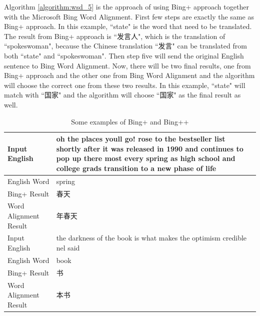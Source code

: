 Algorithm \ref{algorithm:wsd_5} is the approach of using Bing+ approach together with the Microsoft Bing Word Alignment. First few steps are exactly the same as Bing+ approach. In this example, ``state" is the word that need to be translated. The result from Bing+ approach is ``发言人", which is the translation of ``spokeswoman", because the Chinese translation ``发言" can be translated from both ``state" and ``spokeswoman". Then step five will send the original English sentence to Bing Word Alignment. Now, there will be two final results, one from Bing+ approach and the other one from Bing Word Alignment and the algorithm will choose the correct one from these two results. In this example, ``state" will match with ``国家" and the algorithm will choose ``国家" as the final result as well.


\begin{table}[ht]
    \caption{Some examples of Bing+ and Bing++}
    \label{table:bing_plus_plus_3}
    
    \begin{center}
    \begin{tabular}{| p{2.5cm} | p{4cm} |}
        \hline
        Input English & oh the places youll go! rose to the bestseller list shortly after it was released in 1990 and continues to pop up there most every spring as high school and college grads transition to a new phase of life\\
        \hline
        English Word & spring \\
        \hline
        Bing+ Result & 春天\\
        \hline
        Word Alignment Result & 年春天\\
        \hline
        Input English & the darkness of the book is what makes the optimism credible nel said\\
        \hline
        English Word & book \\
        \hline
        Bing+ Result & 书\\
        \hline
        Word Alignment Result & 本书\\
        \hline
    \end{tabular}
    \end{center}
\end{table}

